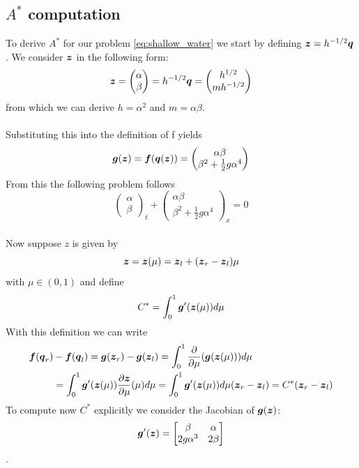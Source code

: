 \documentclass[oneside,12pt]{book}  %
\theoremstyle{plain}
\theoremstyle{definition}
\theoremstyle{remark}
\numberwithin{equation}{chapter} %
\begin{document}
\subsection{$A^*$ computation}

To derive $A^*$ for our problem \ref{eq:shallow_water} we start by
defining ${\mbox{\boldmath$z$}}=h^{-1/2}{\mbox{\boldmath$q$}}$. We consider ${\mbox{\boldmath$z$}}$ in the following
form: $${\mbox{\boldmath$z$}}=\begin{pmatrix} \alpha \\ \beta \end{pmatrix}=h^{-1/2}{\mbox{\boldmath$q$}}=\begin{pmatrix} h^{1/2} \\ mh^{-1/2} \end{pmatrix} $$
from which we can derive $h=\alpha^2$ and $m=\alpha\beta$.
\\
\\
Substituting this into the definition of f yields
\begin{equation}
  \label{eq:roe_flux_z}
  {\mbox{\boldmath$g$}}({\mbox{\boldmath$z$}})={\mbox{\boldmath$f$}}({\mbox{\boldmath$q$}}({\mbox{\boldmath$z$}}))=\begin{pmatrix} \alpha\beta \\ \beta^2+\frac{1}{2}g\alpha^4 \end{pmatrix}
\end{equation}
From this the following problem follows
\begin{equation}
  \label{eq:shallow_water_z}
  \begin{pmatrix} \alpha \\ \beta \end{pmatrix}_t+\begin{pmatrix} \alpha\beta \\ \beta^2+\frac{1}{2}g\alpha^4 \end{pmatrix}_x=0
\end{equation}
\\
Now suppose $z$ is given by $${\mbox{\boldmath$z$}}={\mbox{\boldmath$z$}}(\mu)={\mbox{\boldmath$z$}}_l+({\mbox{\boldmath$z$}}_r-{\mbox{\boldmath$z$}}_l)\mu$$ with $\mu
\in (0,1)$ and define $$C^*=\int_0^1{\mbox{\boldmath$g$}}'({\mbox{\boldmath$z$}}(\mu))d\mu$$
With this definition we can write
\begin{equation}
\begin{split}
  {\mbox{\boldmath$f$}}({\mbox{\boldmath$q$}}_r)&-{\mbox{\boldmath$f$}}({\mbox{\boldmath$q$}}_l)={\mbox{\boldmath$g$}}({\mbox{\boldmath$z$}}_r)-{\mbox{\boldmath$g$}}({\mbox{\boldmath$z$}}_l)=\int_0^1\frac{\partial}{\partial
  \mu}({\mbox{\boldmath$g$}}({\mbox{\boldmath$z$}}(\mu)))d\mu \\
&=\int_0^1{\mbox{\boldmath$g$}}'({\mbox{\boldmath$z$}}(\mu))\frac{\partial
  {\mbox{\boldmath$z$}}}{\partial \mu}(\mu)d\mu
=\int_0^1{\mbox{\boldmath$g$}}'({\mbox{\boldmath$z$}}(\mu))d\mu({\mbox{\boldmath$z$}}_r-{\mbox{\boldmath$z$}}_l)=C^*({\mbox{\boldmath$z$}}_r-{\mbox{\boldmath$z$}}_l)
\end{split}
\end{equation}
To compute now $C^*$ explicitly we consider the Jacobian of
${\mbox{\boldmath$g$}}({\mbox{\boldmath$z$}})$: $${\mbox{\boldmath$g$}}'({\mbox{\boldmath$z$}})=\begin{bmatrix} \beta & \alpha \\ 2g\alpha^3
  & 2\beta \end{bmatrix}$$.
\end{document}
